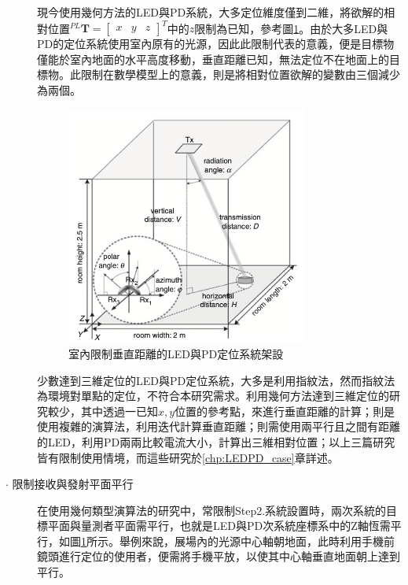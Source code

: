 \begin{description}
        \qquad 
        現今使用幾何方法的LED與PD系統，大多定位維度僅到二維\cite{survey_light2018}，將欲解的相對位置$^{PL}\boldsymbol{T}=\left[\begin{array}{ccc}x&y&z\end{array}\right]^T$中的$z$限制為已知，參考圖\ref{pic:case_parallel}。由於大多LED與PD的定位系統使用室內原有的光源，因此此限制代表的意義，便是目標物僅能於室內地面的水平高度移動，垂直距離已知，無法定位不在地面上的目標物。此限制在數學模型上的意義，則是將相對位置欲解的變數由三個減少為兩個。

        \begin{figure}[htpb]
            \centering
            \includegraphics[width=8cm]{ch2pic/case_parallel.png}
            \caption{室內限制垂直距離的LED與PD定位系統架設\cite{case:aoa}}
            \label{pic:case_parallel}
        \end{figure}
        
        \qquad
        少數達到三維定位的LED與PD定位系統，大多是利用指紋法\cite{case:ml}，然而指紋法為環境對單點的定位，不符合本研究需求。利用幾何方法達到三維定位的研究較少，其中\cite{case:cart3d}透過一已知$x,y$位置的參考點，來進行垂直距離的計算；\cite{case:3d_layers}則是使用複雜的演算法，利用迭代計算垂直距離；\cite{case:hypercube}則需使用兩平行且之間有距離的LED，利用PD兩兩比較電流大小，計算出三維相對位置；以上三篇研究皆有限制使用情境，而這些研究於\ref{chp:LEDPD_case}章詳述。



        \item[$\cdot$ 限制接收與發射平面平行]   \hfill
        
        \qquad
        在使用幾何類型演算法的研究中，常限制Step2.系統設置時，兩次系統的目標平面與量測者平面需平行，也就是LED與PD次系統座標系中的Z軸恆需平行，如圖\ref{pic:case_parallel}所示。舉例來說，展場內的光源中心軸朝地面，此時利用手機前鏡頭進行定位的使用者，便需將手機平放，以使其中心軸垂直地面朝上達到平行。


\end{description}
